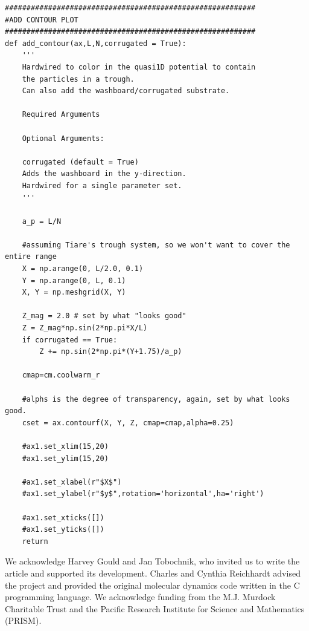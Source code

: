 \documentclass[twocolumn,preprintnumbers,amsmath,amssymb,aps,prx]{revtex4}
\begin{document}
\begin{verbatim}
##########################################################
#ADD CONTOUR PLOT
##########################################################
def add_contour(ax,L,N,corrugated = True):
    '''
    Hardwired to color in the quasi1D potential to contain 
    the particles in a trough.  
    Can also add the washboard/corrugated substrate.

    Required Arguments

    Optional Arguments:

    corrugated (default = True)  
    Adds the washboard in the y-direction.  
    Hardwired for a single parameter set.    
    '''

    a_p = L/N

    #assuming Tiare's trough system, so we won't want to cover the entire range
    X = np.arange(0, L/2.0, 0.1)
    Y = np.arange(0, L, 0.1)
    X, Y = np.meshgrid(X, Y)

    Z_mag = 2.0 # set by what "looks good"
    Z = Z_mag*np.sin(2*np.pi*X/L)
    if corrugated == True:
        Z += np.sin(2*np.pi*(Y+1.75)/a_p) 

    cmap=cm.coolwarm_r

    #alphs is the degree of transparency, again, set by what looks good.
    cset = ax.contourf(X, Y, Z, cmap=cmap,alpha=0.25)

    #ax1.set_xlim(15,20)
    #ax1.set_ylim(15,20)

    #ax1.set_xlabel(r"$X$")
    #ax1.set_ylabel(r"$y$",rotation='horizontal',ha='right')

    #ax1.set_xticks([])
    #ax1.set_yticks([])
    return
\end{verbatim}

\begin{acknowledgments}

  We acknowledge Harvey Gould and Jan Tobochnik,
  who invited us to write the article and
  supported its development.
  Charles and Cynthia Reichhardt advised 
  the project and provided the original molecular dynamics code
  written in the C programming language.
  We acknowledge funding from the M.J. Murdock Charitable Trust
  and the Pacific Research Institute for Science and Mathematics (PRISM).

\end{acknowledgments}
\end{document}
